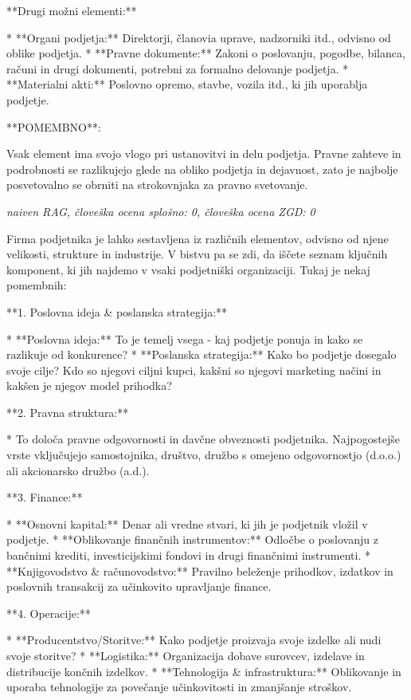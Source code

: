 \documentclass[a4paper,12pt,openright]{book}
\begin{document}
**Drugi možni elementi:**

* **Organi podjetja:** Direktorji, članovia uprave, nadzorniki itd., odvisno od oblike podjetja.
* **Pravne dokumente:**  Zakoni o poslovanju, pogodbe, bilanca, računi in drugi dokumenti, potrebni za formalno delovanje podjetja.
* **Materialni akti:** Poslovno opremo, stavbe, vozila itd., ki jih uporablja podjetje.

**POMEMBNO**:

Vsak element ima svojo vlogo pri ustanovitvi in delu podjetja. Pravne zahteve in podrobnosti se razlikujejo glede na obliko podjetja in dejavnost, zato je najbolje posvetovalno se obrniti na strokovnjaka za pravno svetovanje.

\vspace{0.5cm}
\textit{naiven RAG, človeška ocena splošno: 0, človeška ocena ZGD: 0}

Firma podjetnika je lahko sestavljena iz različnih elementov, odvisno od njene velikosti, strukture in industrije. V bistvu pa se zdi, da iščete seznam ključnih komponent, ki jih najdemo v vsaki podjetniški organizaciji. Tukaj je nekaj pomembnih:

**1. Poslovna ideja \& poslanska strategija:**

* **Poslovna ideja:** To je temelj vsega - kaj podjetje ponuja in kako se razlikuje od konkurence?
* **Poslanska strategija:** Kako bo podjetje dosegalo svoje cilje? Kdo so njegovi ciljni kupci, kakšni so njegovi marketing načini in kakšen je njegov model prihodka?

**2. Pravna struktura:**

* To določa pravne odgovornosti in davčne obveznosti podjetnika. Najpogostejše vrste vključujejo samostojnika, društvo, družbo s omejeno odgovornostjo (d.o.o.) ali akcionarsko družbo (a.d.).

**3. Finance:**

* **Osnovni kapital:** Denar ali vredne stvari, ki jih je podjetnik vložil v podjetje.
* **Oblikovanje finančnih instrumentov:**  Odločbe o poslovanju z bančnimi krediti, investicijskimi fondovi in drugi finančnimi instrumenti.
* **Knjigovodstvo \& računovodstvo:** Pravilno beleženje prihodkov, izdatkov in poslovnih transakcij za učinkovito upravljanje finance.

**4. Operacije:**

* **Producentstvo/Storitve:** Kako podjetje proizvaja svoje izdelke ali nudi svoje storitve?
* **Logistika:** Organizacija dobave surovcev, izdelave in distribucije končnih izdelkov.
* **Tehnologija \& infrastruktura:** Oblikovanje in uporaba tehnologije za povečanje učinkovitosti in zmanjšanje stroškov.
\end{document}
